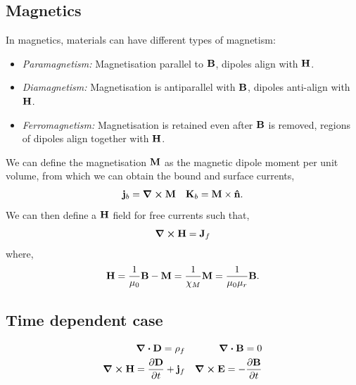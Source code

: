 \documentclass{book}
\begin{document}
\subsection{Magnetics}
In magnetics, materials can have different types of magnetism:
\begin{itemize}
	\item \textit{Paramagnetism:} Magnetisation parallel to $\vb{B}$, dipoles align with $\vb{H}$.
	\item \textit{Diamagnetism:} Magnetisation is antiparallel with $\vb{B}$, dipoles anti-align with $\vb{H}$.
	\item \textit{Ferromagnetism:} Magnetisation is retained even after $\vb{B}$ is removed, regions of dipoles align together with $\vb{H}$.
\end{itemize}
We can define the magnetisation $\vb{M}$ as the magnetic dipole moment per unit volume, from which we can obtain the bound and surface currents,
\begin{align}
	\vb{j}_b = \curl{\vb{M}} && \vb{K}_b = \vb{M} \times \vu{n}.
\end{align}
We can then define a $\vb{H}$ field for free currents such that,
\begin{equation}
	\curl{\vb{H}} = \vb{J}_f
\end{equation}
where,
\begin{equation}
	\vb{H} = \frac{1}{\mu_0}\vb{B} - \vb{M} = \frac{1}{\chi_M}\vb{M} = \frac{1}{\mu_0\mu_r}\vb{B}.
\end{equation}
\subsection{Time dependent case}
\begin{align}
	\div{\vb{D}} = \rho_f && \div{\vb{B}} = 0\\
	\curl{\vb{H}} = \pdv{\vb{D}}{t} + \vb{j}_f && \curl{\vb{E}} = -\pdv{\vb{B}}{t}
\end{align}
\end{document}
